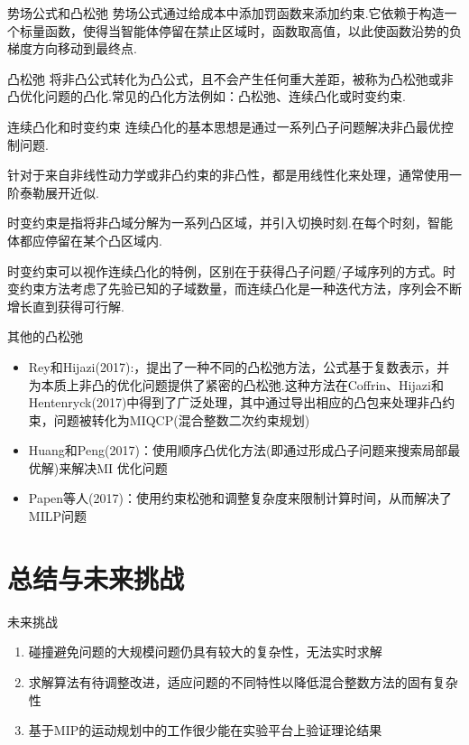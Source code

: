 \documentclass[notheorems,11pt]{beamer}
\theoremstyle{plain}
\numberwithin{theorem}{section}
\numberwithin{lemma}{section}
\numberwithin{corollary}{section}
\theoremstyle{example}
\begin{document}
\begin{frame}{势场公式和凸松弛}
  势场公式通过给成本中添加罚函数来添加约束.它依赖于构造一个标量函数，使得当智能体停留在禁止区域时，函数取高值，以此使函数沿势的负梯度方向移动到最终点.
    \begin{block}{凸松弛}
    将非凸公式转化为凸公式，且不会产生任何重大差距，被称为凸松弛或非凸优化问题的凸化.常见的凸化方法例如：凸松弛、连续凸化或时变约束.
  \end{block}
\end{frame}


\begin{frame}{连续凸化和时变约束}
  连续凸化的基本思想是通过一系列凸子问题解决非凸最优控制问题.\par
  针对于来自非线性动力学或非凸约束的非凸性，都是用线性化来处理，通常使用一阶泰勒展开近似.\par
  \vspace{1 em}
  时变约束是指将非凸域分解为一系列凸区域，并引入切换时刻.在每个时刻，智能体都应停留在某个凸区域内.\par
  时变约束可以视作连续凸化的特例，区别在于获得凸子问题/子域序列的方式。时变约束方法考虑了先验已知的子域数量，而连续凸化是一种迭代方法，序列会不断增长直到获得可行解.
\end{frame}



\begin{frame}{其他的凸松弛}
  \begin{itemize}
    \item Rey和Hijazi(2017):，提出了一种不同的凸松弛方法，公式基于复数表示，并为本质上非凸的优化问题提供了紧密的凸松弛.这种方法在Coffrin、Hijazi和Hentenryck(2017)中得到了广泛处理，其中通过导出相应的凸包来处理非凸约束，问题被转化为MIQCP(混合整数二次约束规划)
    \item Huang和Peng(2017)：使用顺序凸优化方法(即通过形成凸子问题来搜索局部最优解)来解决MI 优化问题
    \item Papen等人(2017)：使用约束松弛和调整复杂度来限制计算时间，从而解决了MILP问题
  \end{itemize}
\end{frame}

\section{总结与未来挑战}

\begin{frame}{未来挑战}
  \begin{enumerate}
    \item 碰撞避免问题的大规模问题仍具有较大的复杂性，无法实时求解
    \item 求解算法有待调整改进，适应问题的不同特性以降低混合整数方法的固有复杂性
    \item 基于MIP的运动规划中的工作很少能在实验平台上验证理论结果
  \end{enumerate}
\end{frame}
\end{document}
